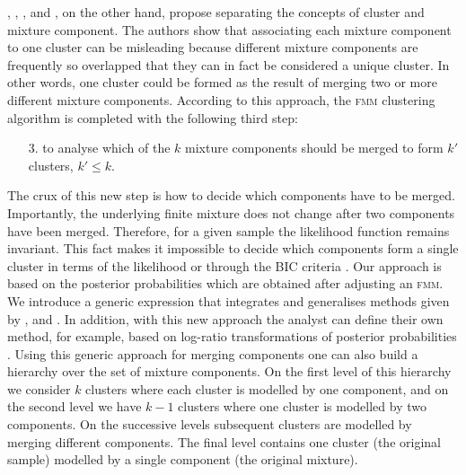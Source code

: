 \documentclass[submit]{smj}
\theoremstyle{definition}
\newcommand{\fmm}{\textsc{fmm}\xspace}
\begin{document}
\cite{lee2004combining}, \cite{hennig2010methods}, \cite{baudry2010combining}, \cite{melnykov2013distribution} and \cite{pastore2013merging}, on the other hand, propose separating the concepts of cluster and mixture component. The authors show that associating each mixture component to one cluster can be misleading because different mixture components are frequently so overlapped that they can in fact be considered a unique cluster. In other words, one cluster could be formed as the result of merging two or more different mixture components. According to this approach, the \fmm clustering algorithm is completed with the following third step:

\begin{itemize}
\item[3.] to analyse which of the $k$ mixture components should be merged to form $k'$ clusters, $k' \leq k$.
\end{itemize}

The crux of this new step is how to decide which components have to be merged. Importantly, the underlying finite mixture does not change after two components have been merged. Therefore, for a given sample the likelihood function remains invariant. This fact makes it impossible to decide which components form a single cluster in terms of the likelihood or through the BIC criteria \citep{hennig2010methods}. Our approach is based on the posterior probabilities which are obtained after adjusting an \fmm. We introduce a generic expression that integrates and generalises methods given by \cite{baudry2010combining}, \cite{hennig2010methods} and \cite{longford2014}. In addition, with this new approach the analyst can define their own method, for example, based on log-ratio transformations of posterior probabilities \citep{aitchison1986statistical}. 
Using this generic approach for merging components one can also build a hierarchy over the set of mixture components. On the first level of this hierarchy we consider $k$ clusters where each cluster is modelled by one component, and on the second level we have $k-1$ clusters where one cluster is modelled by two components. On the successive levels subsequent clusters are modelled by merging different components. The final level contains one cluster (the original sample) modelled by a single component (the original mixture).
\end{document}
